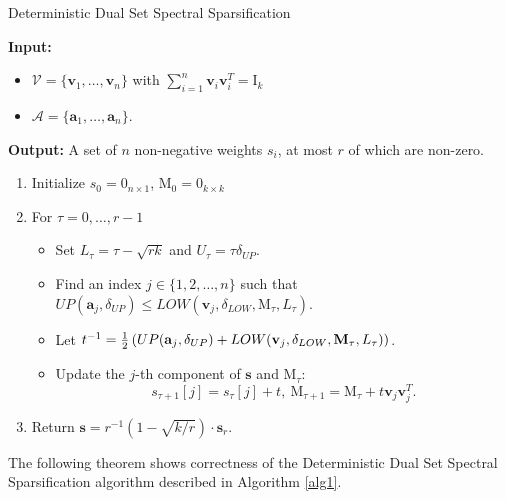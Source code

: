 \documentclass[11pt]{article}
\newcommand{\mat}[1]{{\ensuremath{\bm{\mathrm{#1}}}}}
\def\s{{\mathbf s}}
\def\ve{{\mathbf v}}
\def\matI{\mat{I}}
\def\matM{\mat{M}}
\def\frac#1#2{{#1\over #2}}
\def\a{{\mathbf a}}
\begin{document}
\begin{algorithm}[t]
\caption{Deterministic Dual Set Spectral Sparsification}
\label{alg1}
{\bf Input:} 
\begin{itemize}
\item $\mathcal{V} = \{\ve_1, \ldots, \ve_n\}$ with $\sum_{i=1}^n \ve_i \ve_i^T = \matI_{k}$
\item $\mathcal{A} = \{\a_1, \ldots, \a_n\}$. 
\end{itemize}
{\bf Output:}
A set of $n$ non-negative weights $s_i$, at most $r$ of which are non-zero. 
\begin{enumerate}
\item Initialize $s_0 = \mat0_{n \times 1}$, $\matM_0 = \mat0_{k \times k}$
\item For $\tau = 0, \ldots, r-1$
\begin{itemize}
\item Set $L_{\tau} = \tau - \sqrt{rk}$ and $U_{\tau} = \tau \delta_{UP}$. 
\item Find an index $j \in \{1, 2, \ldots, n\}$ such that
$UP(\a_j, \delta_{UP}) \leq LOW(\ve_j, \delta_{LOW}, \matM_{\tau}, L_{\tau})$. 
\item Let $t^{-1} = \frac{1}{2} \left (UP(\a_j, \delta_{UP}) + LOW(\ve_j, \delta_{LOW}, \matM_{\tau}, L_{\tau}) \right )$. 
\item Update the $j$-th component of $\s$ and $\matM_{\tau}$:
$$s_{\tau+1}[j] = s_{\tau}[j]+t, \ \matM_{\tau+1} = \matM_{\tau} + t\ve_j \ve_j^T.$$
\end{itemize}
\item Return $\s = r^{-1}(1-\sqrt{k/r}) \cdot \s_r$.
\end{enumerate}
\end{algorithm}
The following theorem shows correctness of 
the Deterministic Dual Set Spectral Sparsification algorithm
described in Algorithm \ref{alg1}. 
\end{document}
